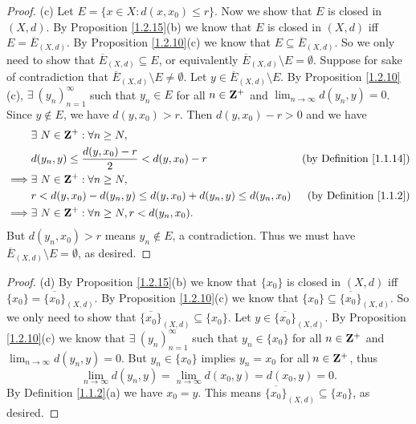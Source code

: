 \begin{proof}{(c)}
    Let \(E = \{x \in X : d(x, x_0) \leq r\}\).
    Now we show that \(E\) is closed in \((X, d)\).
    By Proposition \ref{1.2.15}(b) we know that \(E\) is closed in \((X, d)\) iff \(E = \overline{E}_{(X, d)}\).
    By Proposition \ref{1.2.10}(c) we know that \(E \subseteq \overline{E}_{(X, d)}\).
    So we only need to show that \(\overline{E}_{(X, d)} \subseteq E\), or equivalently \(\overline{E}_{(X, d)} \setminus E = \emptyset\).
    Suppose for sake of contradiction that \(\overline{E}_{(X, d)} \setminus E \neq \emptyset\).
    Let \(y \in \overline{E}_{(X, d)} \setminus E\).
    By Proposition \ref{1.2.10}(c), \(\exists\ (y_n)_{n = 1}^\infty\) such that \(y_n \in E\) for all \(n \in \mathbf{Z}^+\) and \(\lim_{n \to \infty} d(y_n, y) = 0\).
    Since \(y \notin E\), we have \(d(y, x_0) > r\).
    Then \(d(y, x_0) - r > 0\) and we have
    \begin{align*}
                 & \exists\ N \in \mathbf{Z}^+ : \forall n \geq N,                                                                     \\
                 & d(y_n, y) \leq \frac{d(y, x_0) - r}{2} < d(y, x_0) - r                & \text{(by Definition \ref{1.1.14})} \\
        \implies & \exists\ N \in \mathbf{Z}^+ : \forall n \geq N,                                                                     \\
                 & r < d(y, x_0) - d(y_n, y) \leq d(y, x_0) + d(y_n, y) \leq d(y_n, x_0) & \text{(by Definition \ref{1.1.2})}  \\
        \implies & \exists\ N \in \mathbf{Z}^+ : \forall n \geq N, r < d(y_n, x_0).
    \end{align*}
    But \(d(y_n, x_0) > r\) means \(y_n \notin E\), a contradiction.
    Thus we must have \(\overline{E}_{(X, d)} \setminus E = \emptyset\), as desired.
\end{proof}

\begin{proof}{(d)}
    By Proposition \ref{1.2.15}(b) we know that \(\{x_0\}\) is closed in \((X, d)\) iff \(\{x_0\} = \overline{\{x_0\}}_{(X, d)}\).
    By Proposition \ref{1.2.10}(c) we know that \(\{x_0\} \subseteq \overline{\{x_0\}}_{(X, d)}\).
    So we only need to show that \(\overline{\{x_0\}}_{(X, d)} \subseteq \{x_0\}\).
    Let \(y \in \overline{\{x_0\}}_{(X, d)}\).
    By Proposition \ref{1.2.10}(c) we know that \(\exists\ (y_n)_{n = 1}^\infty\) such that \(y_n \in \{x_0\}\) for all \(n \in \mathbf{Z}^+\) and \(\lim_{n \to \infty} d(y_n, y) = 0\).
    But \(y_n \in \{x_0\}\) implies \(y_n = x_0\) for all \(n \in \mathbf{Z}^+\), thus
    \[
        \lim_{n \to \infty} d(y_n, y) = \lim_{n \to \infty} d(x_0, y) = d(x_0, y) = 0.
    \]
    By Definition \ref{1.1.2}(a) we have \(x_0 = y\).
    This means \(\overline{\{x_0\}}_{(X, d)} \subseteq \{x_0\}\), as desired.
\end{proof}

